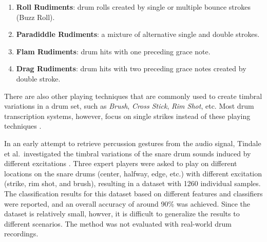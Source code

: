 \documentclass{article}
\begin{document}
\begin{enumerate}
	\item \textbf{Roll Rudiments}: drum rolls created by single or multiple bounce strokes (Buzz Roll).
	\item \textbf{Paradiddle Rudiments}: a mixture of alternative single and double strokes. 
	\item \textbf{Flam Rudiments}: drum hits with one preceding grace note.
	\item \textbf{Drag Rudiments}: drum hits with two preceding grace notes created by double stroke.
\end{enumerate}

There are also other playing techniques that are commonly used to create timbral variations in a drum set, such as \textit{Brush}, \textit{Cross Stick}, \textit{Rim Shot}, etc. Most drum transcription systems, however, focus on single strikes instead of these playing techniques \cite{Benetos2014, Dittmar2014, Thompson2014, Roebel2015, Wu2015a}. 

In an early attempt to retrieve percussion gestures from the audio signal, Tindale et al.~investigated the timbral variations of the snare drum sounds induced by different excitations \cite{Tindale2004}. Three expert players were asked to play on different locations on the snare drums (center, halfway, edge, etc.) with different excitation (strike, rim shot, and brush), resulting in a dataset with 1260 individual samples. The classification results for this dataset based on different features and classifiers  {\color{red}{elaborate on features and classifiers?}} were reported, and an overall accuracy of around 90\% was achieved. Since the dataset is relatively small, howver, it is difficult to generalize the results to different scenarios. The method was not evaluated with real-world drum recordings. {\color{red}{maybe combine summary with following paper?}}
\end{document}

